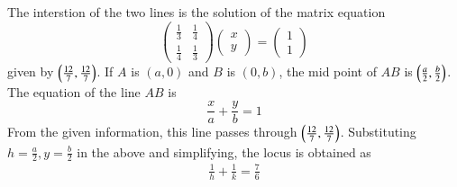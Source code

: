 The interstion of the two lines is the solution of the matrix equation
%
\begin{equation}
\begin{pmatrix}
\frac{1}{3} & \frac{1}{4} \\
\frac{1}{4} & \frac{1}{3}
\end{pmatrix}
\begin{pmatrix}
x\\
y
\end{pmatrix}
=
\begin{pmatrix}
1
\\
1
\end{pmatrix}
\end{equation}
%
given by $\left(\frac{12}{7},\frac{12}{7}\right)$. 
If $A$  is $(a,0)$ and $B$ is $(0,b)$, the mid point of $AB$ is $\left(\frac{a}{2},\frac{b}{2}\right)$. The equation of the line $AB$ is
%
\begin{equation}
\frac{x}{a} + \frac{y}{b} = 1
\end{equation}
%
From the given information, this line passes through $\left(\frac{12}{7},\frac{12}{7}\right)$.  Substituting $h = \frac{a}{2}, y = \frac{b}{2}$ in the above and simplifying, the locus is obtained as
%
\begin{align}
\frac{1}{h} + \frac{1}{k} = \frac{7}{6}
\end{align}
%
